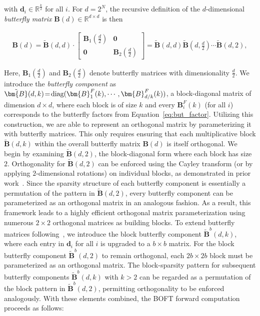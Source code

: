 with $\bm{d}_i\in\mathbb{R}^{\frac{k}{2}}$ for all $i$. For $d=2^N$, the recursive definition of the $d$-dimensional \emph{butterfly matrix} $\bm{B}(d)\in\mathbb{R}^{d\times d}$ is then

\begin{equation}
\begin{aligned}
    \!\!\bm{B}(d)=\tilde{\bm{B}}(d,d)\!\cdot\!\begin{bmatrix}
    \bm{B}_1(\frac{d}{2})\!\!\!\!\! & \bm{0} \\
    \bm{0}\!\!\!\!\! &\bm{B}_2(\frac{d}{2})
    \end{bmatrix}= \tilde{\bm{B}}(d,d)\tilde{\bm{B}}(d,\frac{d}{2})\cdots\tilde{\bm{B}}(d,2),
\end{aligned}
\end{equation}

Here, $\bm{B}_1(\frac{d}{2})$ and $\bm{B}_2(\frac{d}{2})$ denote butterfly matrices with dimensionality $\frac{d}{2}$. We introduce the \emph{butterfly component} as $\thickmuskip=2mu \medmuskip=2mu \tilde{\bm{B}}(d,k)=\text{diag}(\bm{B}^F_1(k),\cdots,\bm{B}^F_{d/k}(k))$, a block-diagonal matrix of dimension $d\times d$, where each block is of size $k$ and every $\bm{B}^F_i(k)$ (for all $i$) corresponds to the butterfly factors from Equation~\ref{eq:but_factor}. Utilizing this construction, we are able to represent an orthogonal matrix by parameterizing it with butterfly matrices. This only requires ensuring that each multiplicative block $\tilde{\bm{B}}(d,k)$ within the overall butterfly matrix $\bm{B}(d)$ is itself orthogonal. We begin by examining $\tilde{\bm{B}}(d,2)$, the block-diagonal form where each block has size $2$. Orthogonality for $\tilde{\bm{B}}(d,2)$ can be enforced using the Cayley transform (or by applying $2$-dimensional rotations) on individual blocks, as demonstrated in prior work~\cite{liu2021orthogonal,qiu2023controlling}. Since the sparsity structure of each butterfly component is essentially a permutation of the pattern in $\tilde{\bm{B}}(d,2)$, every butterfly component can be parameterized as an orthogonal matrix in an analogous fashion. As a result, this framework leads to a highly efficient orthogonal matrix parameterization using numerous $2\times 2$ orthogonal matrices as building blocks. To extend butterfly matrices following~\cite{chen2022pixelated}, we introduce the block butterfly component $\tilde{\bm{B}}^b(d,k)$, where each entry in $\bm{d}_i$ for all $i$ is upgraded to a $b\times b$ matrix. For the block butterfly component $\tilde{\bm{B}}^b(d,2)$ to remain orthogonal, each $2b\times 2b$ block must be parameterized as an orthogonal matrix. The block-sparsity pattern for subsequent butterfly components $\tilde{\bm{B}}^b(d,k)$ with $k>2$ can be regarded as a permutation of the block pattern in $\tilde{\bm{B}}^b(d,2)$, permitting orthogonality to be enforced analogously. With these elements combined, the BOFT forward computation proceeds as follows:

